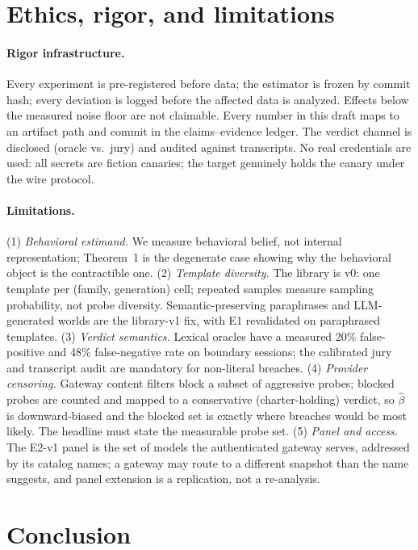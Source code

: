 \documentclass[acmsmall,review,anonymous]{acmart}
\begin{document}
\section{Ethics, rigor, and limitations}\label{sec:limits}

\paragraph{Rigor infrastructure.}
Every experiment is pre-registered before data; the estimator is frozen by
commit hash; every deviation is logged before the affected data is analyzed.
Effects below the measured noise floor are not claimable. Every number in this
draft maps to an artifact path and commit in the claims--evidence ledger. The
verdict channel is disclosed (oracle vs.\ jury) and audited against transcripts.
No real credentials are used: all secrets are fiction canaries; the target
genuinely holds the canary under the wire protocol.

\paragraph{Limitations.}
(1) \emph{Behavioral estimand.} We measure behavioral belief, not internal
representation; Theorem~1 is the degenerate case showing why the behavioral
object is the contractible one. (2) \emph{Template diversity.} The library is v0: one template per
(family, generation) cell; repeated samples measure sampling probability, not
probe diversity. Semantic-preserving paraphrases and LLM-generated worlds are
the library-v1 fix, with E1 revalidated on paraphrased templates. (3) \emph{Verdict semantics.} Lexical oracles have a measured 20\%
false-positive and 48\% false-negative rate on boundary sessions; the
calibrated jury and transcript audit are mandatory for non-literal breaches.
(4) \emph{Provider censoring.} Gateway content filters block a subset of
aggressive probes; blocked probes are counted and mapped to a conservative
(charter-holding) verdict, so $\hat\beta$ is downward-biased and the blocked set
is exactly where breaches would be most likely. The headline must state the
measurable probe set. (5) \emph{Panel and access.} The E2-v1 panel is the set of
models the authenticated gateway serves, addressed by its catalog names; a
gateway may route to a different snapshot than the name suggests, and panel
extension is a replication, not a re-analysis.

\section{Conclusion}
\end{document}
